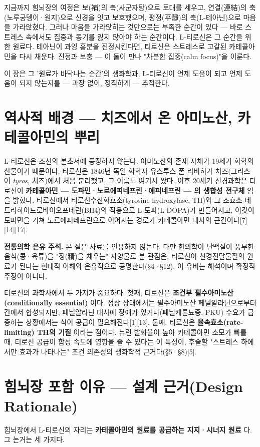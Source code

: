 \documentclass[11pt,oneside]{book}
\newenvironment{authnote}
  {\par\smallskip\begingroup\leftskip=7mm\rightskip=5mm\small\color{muted}\noindent\ignorespaces}
  {\par\endgroup\smallskip}
\begin{document}
지금까지 힘뇌장의 여정은 보(補)의 축(사군자탕)으로 토대를 세우고, 연결(連結)의 축(노루궁뎅이·원지)으로 신경을 잇고 보호했으며, 평정(平靜)의 축(L-테아닌)으로 마음을 가라앉혔다. 그러나 마음을 가라앉히는 것만으로는 부족한 순간이 있다 — 바로 스트레스 속에서도 집중과 동기를 잃지 않아야 하는 순간이다. L-티로신은 그 순간을 위한 원료다. 테아닌이 과잉 흥분을 진정시킨다면, 티로신은 스트레스로 고갈된 카테콜아민을 다시 채운다. 진정과 보충 — 이 둘이 만나 "차분한 집중(calm focus)"을 이룬다.

이 장은 그 '원료가 바닥나는 순간'의 생화학과, L-티로신이 언제 도움이 되고 언제 도움이 되지 않는지를 — 과장 없이, 정직하게 — 추적한다.

\section{역사적 배경 — 치즈에서 온 아미노산, 카테콜아민의 뿌리}
L-티로신은 조선의 본초서에 등장하지 않는다. 아미노산의 존재 자체가 19세기 화학의 산물이기 때문이다. 티로신은 1846년 독일 화학자 유스투스 폰 리비히가 치즈(그리스어 \textit{tyros}, 치즈)에서 처음 분리했고, 그 이름도 여기서 왔다. 이후 20세기 신경과학은 티로신이 \textbf{카테콜아민 — 도파민·노르에피네프린·에피네프린 — 의 생합성 전구체} 임을 밝혔다. 티로신에서 티로신수산화효소(tyrosine hydroxylase, TH)와 그 조효소 테트라하이드로바이오프테린(BH4)의 작용으로 L-도파(L-DOPA)가 만들어지고, 이것이 도파민을 거쳐 노르에피네프린으로 이어지는 경로가 카테콜아민 대사의 근간이다[7][14][17].

\begin{authnote}\textbf{전통의학 은유 주석.} 본 절은 사료를 인용하지 않는다. 다만 한의학이 단백질이 풍부한 음식(콩·육류)을 "정(精)을 채우는" 자양물로 본 관점은, 티로신이 신경전달물질의 원료가 된다는 현대적 이해와 은유적으로 공명한다(§4·§12). 이 유비는 해석이며 확정적 주장이 아니다.\end{authnote}
티로신의 과학사에서 두 가지가 중요하다. 첫째, 티로신은 \textbf{조건부 필수아미노산(conditionally essential)} 이다. 정상 상태에서는 필수아미노산 페닐알라닌으로부터 간에서 합성되지만, 페닐알라닌 대사에 장애가 있거나(페닐케톤뇨증, PKU) 수요가 급증하는 상황에서는 식이 공급이 필요해진다[1][13]. 둘째, 티로신은 \textbf{율속효소(rate-limiting) TH의 기질} 이라는 점이다. 뉴런 발화율이 높아 카테콜아민 소모가 빠를 때, 티로신 공급이 합성 속도에 영향을 줄 수 있다는 이 특성이, 후술할 "스트레스 하에서만 효과가 나타나는" 조건 의존성의 생화학적 근거다(§5·§8)[5].

\section{힘뇌장 포함 이유 — 설계 근거(Design Rationale)}
힘뇌장에서 L-티로신의 자리는 \textbf{카테콜아민의 원료를 공급하는 지지·시너지 원료} 다. 그 논거는 세 가지다.
\end{document}
